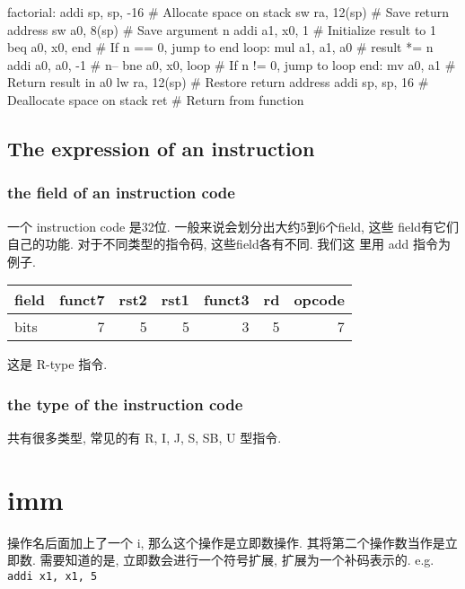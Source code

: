 \documentclass[11pt]{article}
\begin{document}
factorial:
    addi sp, sp, -16  \# Allocate space on stack
    sw ra, 12(sp)     \# Save return address
    sw a0, 8(sp)      \# Save argument n
    addi a1, x0, 1    \# Initialize result to 1
    beq a0, x0, end   \# If n == 0, jump to end
loop:
    mul a1, a1, a0    \# result *= n
    addi a0, a0, -1   \# n--
    bne a0, x0, loop  \# If n != 0, jump to loop
end:
    mv a0, a1         \# Return result in a0
    lw ra, 12(sp)     \# Restore return address
    addi sp, sp, 16   \# Deallocate space on stack
    ret               \# Return from function

\subsection{The expression of an instruction}
\label{sec:org22b9fc6}

\subsubsection{the field of an instruction code}
\label{sec:org8edcda3}

一个 instruction code 是32位. 一般来说会划分出大约5到6个field, 这些
field有它们自己的功能. 对于不同类型的指令码, 这些field各有不同. 我们这
里用 add 指令为例子.

\begin{center}
\begin{tabular}{lrrrrrr}
\hline
field & funct7 & rst2 & rst1 & funct3 & rd & opcode\\
\hline
bits & 7 & 5 & 5 & 3 & 5 & 7\\
\hline
\end{tabular}
\end{center}

这是 R-type 指令. 

\subsubsection{the type of the instruction code}
\label{sec:org6f9e2e4}

共有很多类型, 常见的有 R, I, J, S, SB, U 型指令. 



\section{imm}
\label{sec:org9b81967}
操作名后面加上了一个 i, 那么这个操作是立即数操作. 
其将第二个操作数当作是立即数. 
需要知道的是, 立即数会进行一个符号扩展, 扩展为一个补码表示的.
e.g. \texttt{addi x1, x1, 5}
\end{document}
